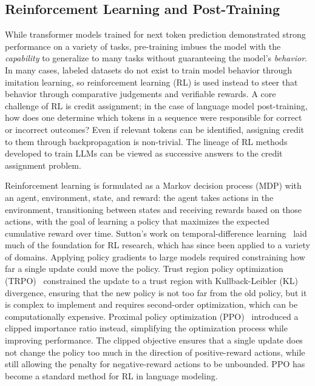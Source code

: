 \subsection{Reinforcement Learning and Post-Training}\label{sec:ch1-rl}
While transformer models trained for next token prediction demonstrated strong performance on a variety of tasks, pre-training imbues the model with the \textit{capability} to generalize to many tasks without guaranteeing the model's \textit{behavior}. In many cases, labeled datasets do not exist to train model behavior through imitation learning, so reinforcement learning (RL) is used instead to steer that behavior through comparative judgements and verifiable rewards. A core challenge of RL is credit assignment; in the case of language model post-training, how does one determine which tokens in a sequence were responsible for correct or incorrect outcomes? Even if relevant tokens can be identified, assigning credit to them through backpropagation is non-trivial. The lineage of RL methods developed to train LLMs can be viewed as successive answers to the credit assignment problem.

Reinforcement learning is formulated as a Markov decision process (MDP) with an agent, environment, state, and reward: the agent takes actions in the environment, transitioning between states and receiving rewards based on those actions, with the goal of learning a policy that maximizes the expected cumulative reward over time. Sutton's work on temporal-difference learning~\cite{Sutton84} laid much of the foundation for RL research, which has since been applied to a variety of domains. Applying policy gradients to large models required constraining how far a single update could move the policy. Trust region policy optimization (TRPO)~\cite{schulman2015trust} constrained the update to a trust region with Kullback-Leibler (KL) divergence, ensuring that the new policy is not too far from the old policy, but it is complex to implement and requires second-order optimization, which can be computationally expensive. Proximal policy optimization (PPO)~\cite{schulman2017proximal} introduced a clipped importance ratio instead, simplifying the optimization process while improving performance. The clipped objective ensures that a single update does not change the policy too much in the direction of positive-reward actions, while still allowing the penalty for negative-reward actions to be unbounded. PPO has become a standard method for RL in language modeling.

